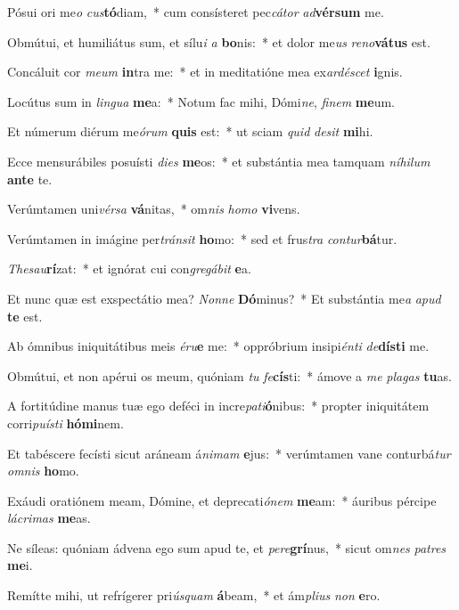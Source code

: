 \item Pósui ori me\textit{o} \textit{cus}\textbf{tó}diam,~* cum consísteret pec\textit{cá}\textit{tor} \textit{ad}\textbf{vér}\textbf{sum} me.
\item Obmútui, et humiliátus sum, et sílu\textit{i} \textit{a} \textbf{bo}nis:~* et dolor me\textit{us} \textit{re}\textit{no}\textbf{vá}\textbf{tus} est.
\item Concáluit cor \textit{me}\textit{um} \textbf{in}tra me:~* et in meditatióne mea ex\textit{ar}\textit{dé}\textit{scet} \textbf{i}gnis.
\item Locútus sum in \textit{lin}\textit{gua} \textbf{me}a:~* Notum fac mihi, Dómi\textit{ne}, \textit{fi}\textit{nem} \textbf{me}um.
\item Et númerum diérum me\textit{ó}\textit{rum} \textbf{quis} est:~* ut sciam \textit{quid} \textit{de}\textit{sit} \textbf{mi}hi.
\item Ecce mensurábiles posuísti \textit{di}\textit{es} \textbf{me}os:~* et substántia mea tamquam \textit{ní}\textit{hi}\textit{lum} \textbf{an}\textbf{te} te.
\item Verúmtamen uni\textit{vér}\textit{sa} \textbf{vá}nitas,~* om\textit{nis} \textit{ho}\textit{mo} \textbf{vi}vens.
\item Verúmtamen in imágine per\textit{tráns}\textit{it} \textbf{ho}mo:~* sed et frus\textit{tra} \textit{con}\textit{tur}\textbf{bá}tur.
\item \textit{The}\textit{sau}\textbf{rí}zat:~* et ignórat cui con\textit{gre}\textit{gá}\textit{bit} \textbf{e}a.
\item Et nunc quæ est exspectátio mea? \textit{Non}\textit{ne} \textbf{Dó}minus?~* Et substántia me\textit{a} \textit{a}\textit{pud} \textbf{te} est.
\item Ab ómnibus iniquitátibus meis \textit{é}\textit{ru}\textbf{e} me:~* oppróbrium insipi\textit{én}\textit{ti} \textit{de}\textbf{dís}\textbf{ti} me.
\item Obmútui, et non apérui os meum, quóniam \textit{tu} \textit{fe}\textbf{cís}ti:~* ámove a \textit{me} \textit{pla}\textit{gas} \textbf{tu}as.
\item A fortitúdine manus tuæ ego deféci in incre\textit{pa}\textit{ti}\textbf{ó}nibus:~* propter iniquitátem corri\textit{pu}\textit{ís}\textit{ti} \textbf{hó}\textbf{mi}nem.
\item Et tabéscere fecísti sicut aráneam á\textit{ni}\textit{mam} \textbf{e}jus:~* verúmtamen vane conturbá\textit{tur} \textit{om}\textit{nis} \textbf{ho}mo.
\item Exáudi oratiónem meam, Dómine, et deprecati\textit{ó}\textit{nem} \textbf{me}am:~* áuribus pércipe \textit{lá}\textit{cri}\textit{mas} \textbf{me}as.
\item Ne síleas: quóniam ádvena ego sum apud te, et \textit{per}\textit{e}\textbf{grí}nus,~* sicut om\textit{nes} \textit{pa}\textit{tres} \textbf{me}i.
\item Remítte mihi, ut refrígerer pri\textit{ús}\textit{quam} \textbf{á}beam,~* et ám\textit{pli}\textit{us} \textit{non} \textbf{e}ro.
